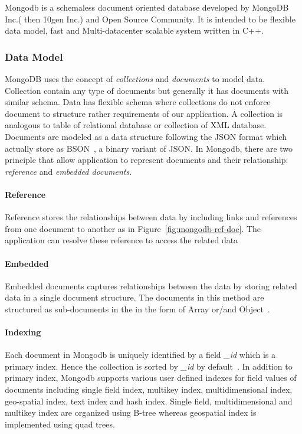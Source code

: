 Mongodb is a schemaless document oriented database developed by MongoDB Inc.( then 10gen Inc.) and Open Source Community. It is intended to be flexible data model, fast and Multi-datacenter scalable system written in C++.
\subsubsection{Data Model}
MongoDB uses the concept of \textit{collections} and \textit{documents} to model data. Collection contain any type of documents but generally it has documents with  similar schema. Data has flexible schema where collections do not enforce document to structure rather requirements of our application. A collection is analogous to table of relational database or collection of XML database. Documents are modeled as a data structure following the JSON format which actually store as BSON~\cite{bson}, a binary variant of JSON.  In Mongodb, there are two principle that allow application to represent documents and their relationship: \textit{reference} and \textit{embedded documents}. 

\paragraph{Reference}
Reference stores the relationships between data by including links and references from one document to another as in  Figure~\ref{fig:mongodb-ref-doc}. The application can resolve these reference to access the related data
\paragraph{Embedded}
Embedded documents captures relationships between the data by storing related data in a single document structure. The documents in this method are structured as sub-documents in the in the form of Array or/and Object~\cite{nosql/comparision}. 
\label{mong-xmark-indexing}

\paragraph{Indexing} 
Each document in Mongodb is uniquely identified by a field \textit{\_id} which is a primary index. Hence the collection is sorted by \textit{\_id} by default~\cite{nosql/comparision}.
In addition to primary index, Mongodb supports various user defined indexes for field values of documents including single field index, multikey index, multidimensional index, geo-spatial index, text index and hash index.  Single field, multidimensional and multikey index are organized using B-tree whereas geospatial index is implemented using quad trees.

